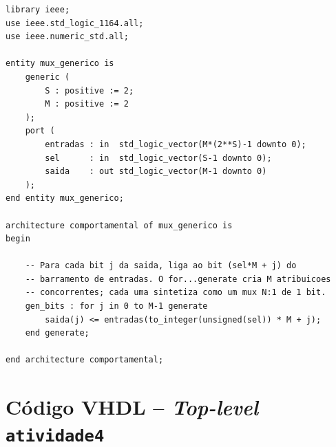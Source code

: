 \documentclass[12pt,a4paper, brazil]{article}
\begin{document}
\begin{lstlisting}[style=vhdl, caption={Arquivo \texttt{mux\_generico.vhd} -- entidade parametrizável.}]
library ieee;
use ieee.std_logic_1164.all;
use ieee.numeric_std.all;

entity mux_generico is
    generic (
        S : positive := 2;
        M : positive := 2
    );
    port (
        entradas : in  std_logic_vector(M*(2**S)-1 downto 0);
        sel      : in  std_logic_vector(S-1 downto 0);
        saida    : out std_logic_vector(M-1 downto 0)
    );
end entity mux_generico;

architecture comportamental of mux_generico is
begin

    -- Para cada bit j da saida, liga ao bit (sel*M + j) do
    -- barramento de entradas. O for...generate cria M atribuicoes
    -- concorrentes; cada uma sintetiza como um mux N:1 de 1 bit.
    gen_bits : for j in 0 to M-1 generate
        saida(j) <= entradas(to_integer(unsigned(sel)) * M + j);
    end generate;

end architecture comportamental;
\end{lstlisting}

\newpage
\section{Código VHDL -- \textit{Top-level} \texttt{atividade4}}
\label{ap:codigo-top}
\end{document}

